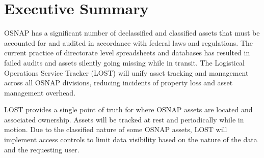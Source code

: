 \chapter*{Executive Summary}
OSNAP has a significant number of declassified and classified assets that must be accounted for and audited in accordance with federal laws and regulations. The current practice of directorate level spreadsheets and databases has resulted in failed audits and assets silently going missing while in transit. The Logistical Operations Service Tracker (LOST) will unify asset tracking and management across all OSNAP divisions, reducing 
incidents of property loss and asset management overhead.

LOST provides a single point of truth for where OSNAP assets are located and associated ownership. Assets will be tracked at rest and periodically while in motion. Due to the classified nature of some OSNAP assets, LOST will implement access controls to limit data visibility based on the nature of the data and the requesting user.